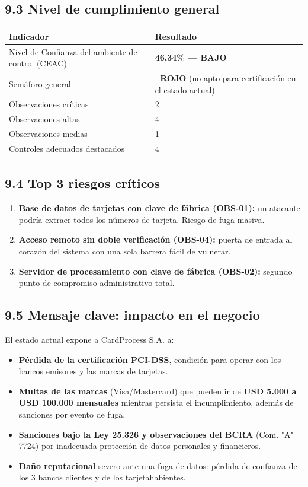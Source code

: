 \documentclass[11pt,a4paper]{article}
\begin{document}
\subsection{9.3 Nivel de cumplimiento general}

\begin{tabularx}{\textwidth}{P{5cm}L}
\toprule
\textbf{Indicador} & \textbf{Resultado} \\
\midrule
Nivel de Confianza del ambiente de control (CEAC) & \textbf{46,34\% — BAJO} \\
Semáforo general & 🔴 \textbf{ROJO} (no apto para certificación en el estado actual) \\
Observaciones críticas & 2 \\
Observaciones altas & 4 \\
Observaciones medias & 1 \\
Controles adecuados destacados & 4 \\
\bottomrule
\end{tabularx}

\subsection{9.4 Top 3 riesgos críticos}

\begin{enumerate}[leftmargin=*]
  \item \textbf{Base de datos de tarjetas con clave de fábrica (OBS-01):} un atacante podría extraer todos los números de tarjeta. Riesgo de fuga masiva.
  \item \textbf{Acceso remoto sin doble verificación (OBS-04):} puerta de entrada al corazón del sistema con una sola barrera fácil de vulnerar.
  \item \textbf{Servidor de procesamiento con clave de fábrica (OBS-02):} segundo punto de compromiso administrativo total.
\end{enumerate}

\subsection{9.5 Mensaje clave: impacto en el negocio}

El estado actual expone a CardProcess S.A. a:

\begin{itemize}[leftmargin=*]
  \item \textbf{Pérdida de la certificación PCI-DSS}, condición para operar con los bancos emisores y las marcas de tarjetas.
  \item \textbf{Multas de las marcas} (Visa/Mastercard) que pueden ir de \textbf{USD 5.000 a USD 100.000 mensuales} mientras persista el incumplimiento, además de sanciones por evento de fuga.
  \item \textbf{Sanciones bajo la Ley 25.326 y observaciones del BCRA} (Com. "A" 7724) por inadecuada protección de datos personales y financieros.
  \item \textbf{Daño reputacional} severo ante una fuga de datos: pérdida de confianza de los 3 bancos clientes y de los tarjetahabientes.
\end{itemize}
\end{document}
